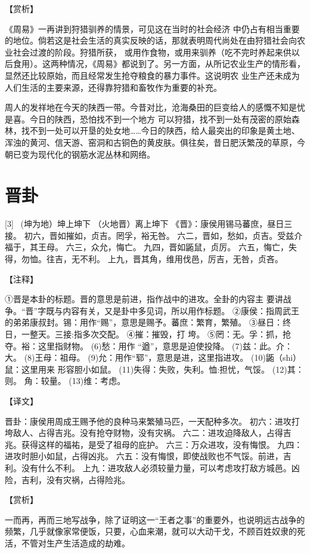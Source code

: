 \documentclass[12pt,UTF8]{ctexbook}
\begin{document}
【赏析】

《周易》一再讲到狩猎驯养的情景，可见这在当时的社会经济 中仍占有相当重要的地位。倘若这是社会生活的真实反映的话，那就表明周代尚处在由狩猎社会向农业社会过渡的阶段。狩猎所获， 或用作食物，或用来驯养（吃不完时养起来供以后食用）。这两种情况，《周易》都说到了。另一方面，从所记农业生产的情形看，显然还比较原始，而且经常发生抢夺粮食的暴力事件。这说明农 业生产还未成为人们生活的主要来源，还得靠狩猎和畜牧作为重要的补充。

周人的发祥地在今天的陕西一带。今昔对比，沧海桑田的巨变给人的感慨不知是忧是喜。今日的陕西，恐怕找不到一个地方 可以狩猎，找不到一处有茂密的原始森林，找不到一处可以开垦的处女地……今日的陕西，给人最突出的印象是黄土地、浑浊的黄河、信天游、窑洞和古铜色的黄皮肤。俱往矣，昔日肥沃繁茂的草原，今朝已变为现代化的钢筋水泥丛林和网络。

\chapter{晋卦}
[3] \ (坤为地）坤上坤下
（火地晋）离上坤下
《晋》：康侯用锡马蕃庶，昼日三接。
初六，晋如摧如，贞吉。罔孚，裕无咎。
六二，晋如，愁如，贞吉。受兹介福于，其王母。
六三，众允，悔亡。
九四，晋如鼫鼠，贞厉。
六五，悔亡，失得，勿恤。往吉，无不利。
上九，晋其角，维用伐邑，厉吉，无咎，贞吝。

【注释】

①晋是本卦的标题。晋的意思是前进，指作战中的进攻。全卦的内容主 要讲战争。“晋”字既与内容有关，又是卦中多见词，所以用作标题。
②康侯：指周武王的弟弟康叔封。锡：用作“赐”，意思是赐予。蕃庶：繁育，繁殖。
③昼日：终日，一整天。三接:指多次交配。
④摧：摧毁，打 垮。
⑤罔：无。孚：抓，抢夺。裕：这里指财物。
(6)愁：用作 “遒”，意思是迫使投降。
(7)兹：此。介：大。
(8)王母：祖母。
(9)允：用作“郓”，意思是进，这里指进攻。
(10)鼫（shi）鼠：这里用来 形容胆小如鼠。
(11)失得：失败，失利。恤:担忧，气馁。
(12)其：则。 角：较量。
(13)维：考虑。

【译文】

晋卦：康侯用周成王赐予他的良种马来繁殖马匹，一天配种多次。
初六：进攻打垮敌人、占得吉兆。没有抢夺财物，没有灾祸。
六二：进攻迫降敌人，占得吉兆。获得这样的福祐，是受了祖母的庇护。
六三：万众进攻，没有悔恨。
九四：进攻时胆小如鼠，占得凶兆。
六五：没有悔恨，即使战败也不气馁。前进，吉利。没有什么不利。
上九：进攻敌人必须较量力量，可以考虑攻打敌方城邑。凶险，吉利，没有灾祸，占得险兆。

【赏析】

一而再，再而三地写战争，除了证明这一“王者之事”的重要外，也说明远古战争的频繁，几乎就像家常便饭，只要，心血来潮，就可以大动干戈，不顾百姓奴隶的死活，不管对生产生活造成的劫难。
\end{document}
